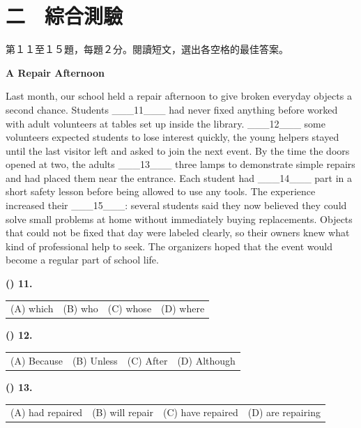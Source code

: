 \documentclass[11pt,a4paper]{article}
\newenvironment{qblock}{\par\vspace{3pt}\noindent\begin{minipage}{\linewidth}}{\end{minipage}\par\vspace{4pt}}
\begin{document}
\section*{二　綜合測驗}
{\small 第１１至１５題，每題２分。閱讀短文，選出各空格的最佳答案。
\par\smallskip
}
\textbf{A Repair Afternoon}\par\smallskip
Last month, our school held a repair afternoon to give broken everyday objects a second chance. Students \_\_\_11\_\_\_ had never fixed anything before worked with adult volunteers at tables set up inside the library. \_\_\_12\_\_\_ some volunteers expected students to lose interest quickly, the young helpers stayed until the last visitor left and asked to join the next event. By the time the doors opened at two, the adults \_\_\_13\_\_\_ three lamps to demonstrate simple repairs and had placed them near the entrance. Each student had \_\_\_14\_\_\_ part in a short safety lesson before being allowed to use any tools. The experience increased their \_\_\_15\_\_\_: several students said they now believed they could solve small problems at home without immediately buying replacements. Objects that could not be fixed that day were labeled clearly, so their owners knew what kind of professional help to seek. The organizers hoped that the event would become a regular part of school life.
\par\smallskip
\begin{qblock}
\textbf{(\hspace{0.6cm}) 11.} 
\par
\begin{tabularx}{\linewidth}{@{}XXXX@{}}
(A) which & (B) who & (C) whose & (D) where
\end{tabularx}
\end{qblock}
\begin{qblock}
\textbf{(\hspace{0.6cm}) 12.} 
\par
\begin{tabularx}{\linewidth}{@{}XXXX@{}}
(A) Because & (B) Unless & (C) After & (D) Although
\end{tabularx}
\end{qblock}
\begin{qblock}
\textbf{(\hspace{0.6cm}) 13.} 
\par
\begin{tabularx}{\linewidth}{@{}XXXX@{}}
(A) had repaired & (B) will repair & (C) have repaired & (D) are repairing
\end{tabularx}
\end{qblock}
\end{document}
